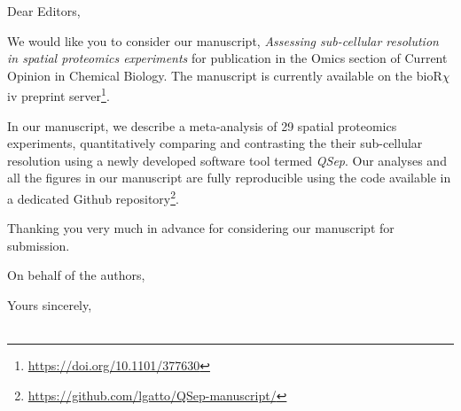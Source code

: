 \documentclass[12pt,a4paper]{letter}
\begin{document}
\begin{letter}{
}

\opening{Dear Editors,}

\thispagestyle{fancy}


We would like you to consider our manuscript, \textit{Assessing
  sub-cellular resolution in spatial proteomics experiments} for
publication in the Omics section of Current Opinion in Chemical
Biology. The manuscript is currently available on the bioR$\chi$iv
preprint server\footnote{\url{https://doi.org/10.1101/377630}}.

In our manuscript, we describe a meta-analysis of 29 spatial
proteomics experiments, quantitatively comparing and contrasting the
their sub-cellular resolution using a newly developed software tool
termed \textit{QSep}. Our analyses and all the figures in our
manuscript are fully reproducible using the code available in a
dedicated Github
repository\footnote{\url{https://github.com/lgatto/QSep-manuscript/}}.


\bigskip

Thanking you very much in advance for considering our manuscript for
submission.

\bigskip


On behalf of the authors,

\closing{Yours sincerely, \\
   \\
}


\end{letter}
\end{document}
